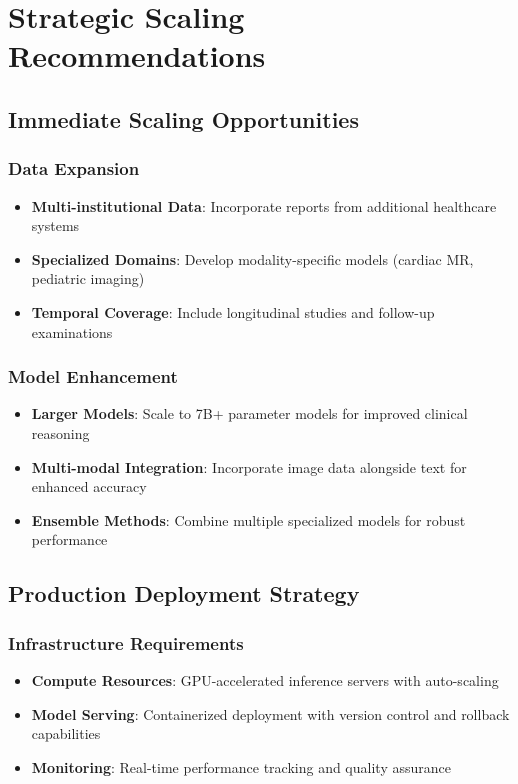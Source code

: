 \documentclass[11pt,letterpaper]{article}
\begin{document}
\section{Strategic Scaling Recommendations}

\subsection{Immediate Scaling Opportunities}

\subsubsection{Data Expansion}
\begin{itemize}
    \item \textbf{Multi-institutional Data}: Incorporate reports from additional healthcare systems
    \item \textbf{Specialized Domains}: Develop modality-specific models (cardiac MR, pediatric imaging)
    \item \textbf{Temporal Coverage}: Include longitudinal studies and follow-up examinations
\end{itemize}

\subsubsection{Model Enhancement}
\begin{itemize}
    \item \textbf{Larger Models}: Scale to 7B+ parameter models for improved clinical reasoning
    \item \textbf{Multi-modal Integration}: Incorporate image data alongside text for enhanced accuracy
    \item \textbf{Ensemble Methods}: Combine multiple specialized models for robust performance
\end{itemize}

\subsection{Production Deployment Strategy}

\subsubsection{Infrastructure Requirements}
\begin{itemize}
    \item \textbf{Compute Resources}: GPU-accelerated inference servers with auto-scaling
    \item \textbf{Model Serving}: Containerized deployment with version control and rollback capabilities
    \item \textbf{Monitoring}: Real-time performance tracking and quality assurance
\end{itemize}
\end{document}
